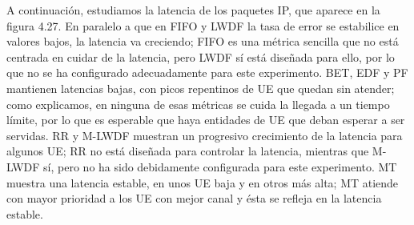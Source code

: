 \documentclass[12pt]{report} %
\begin{document}
A continuación, estudiamos la latencia de los paquetes IP, que aparece en la figura 4.27.
En paralelo a que en FIFO y LWDF la tasa de error se estabilice en valores bajos,
la latencia va creciendo;
FIFO es una métrica sencilla que no está centrada en cuidar de la latencia,
pero LWDF sí está diseñada para ello, por lo que no se ha configurado adecuadamente para este experimento.
BET, EDF y PF mantienen latencias bajas, con picos repentinos de UE que quedan sin atender;
como explicamos, en ninguna de esas métricas se cuida la llegada a un tiempo límite, por lo que es esperable que haya entidades de UE que deban esperar a ser servidas.
RR y  M-LWDF muestran un progresivo crecimiento de la latencia para algunos UE;
RR no está diseñada para controlar la latencia,
mientras que M-LWDF sí, pero no ha sido debidamente configurada para este experimento.
MT muestra una latencia estable, en unos UE baja y en otros más alta;
MT atiende con mayor prioridad a los UE con mejor canal y ésta se refleja en la latencia estable.

%
%
%
\end{document}
